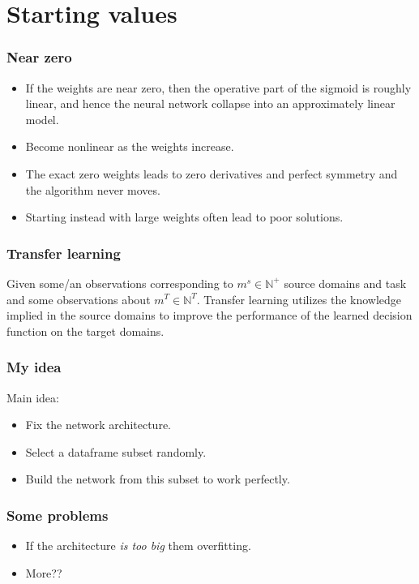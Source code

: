\section{Starting values}

\begin{frame}
    \frametitle{Near zero}
    \begin{itemize}
        \item If the weights are near zero, 
        then the operative part of the sigmoid is roughly linear,
        and hence the neural network collapse into an approximately linear model. 
    
        \item Become nonlinear as the weights increase. 
        \item The exact zero weights leads to zero derivatives and perfect symmetry and the algorithm never moves.  
        \item Starting instead with large weights often lead to poor solutions.
    \end{itemize}

\end{frame}

\begin{frame}
    \frametitle{Transfer learning}
    \begin{definition}
        Given some/an observations corresponding
        to $m^s \in \mathbb{N}^+$ source domains 
        and task and some observations about 
        $m^T \in \mathbb{N}^T$. 
        Transfer learning utilizes the knowledge implied in the source
        domains to improve the performance of the learned decision function
        on the target domains. 
    \end{definition}

    \cite{SurveyonTransferLearning} 

    \cite{aji-etal-2020-neural}
\end{frame}

\begin{frame}
    \frametitle{My idea}
    Main idea:
    \begin{itemize}
        \item Fix the network architecture. 
        \item Select a dataframe subset randomly. 
        \item Build the network from this subset to work perfectly. 
    \end{itemize} 

\end{frame}


\begin{frame}
    \frametitle{Some problems}
    \begin{itemize}
        \item If the architecture \textit{is too big} them overfitting.
        \item More??
    \end{itemize}
\end{frame}